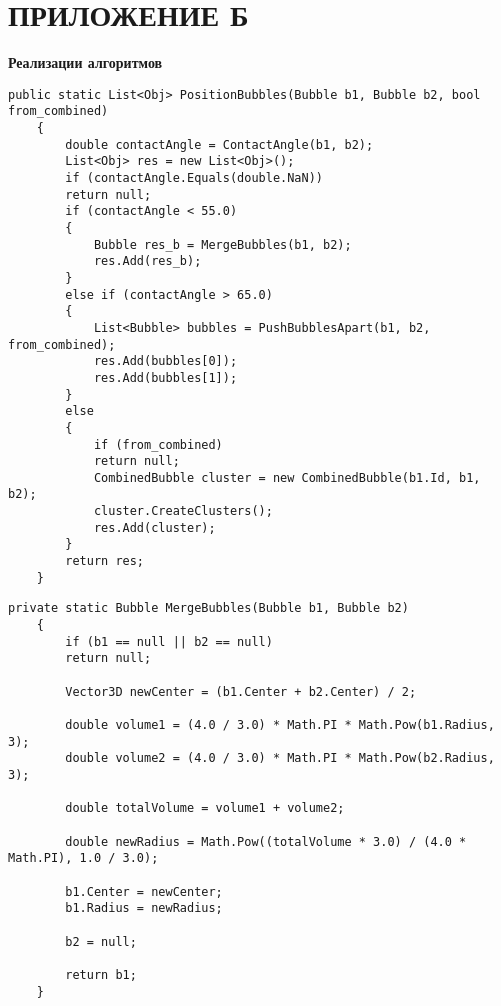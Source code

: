 \chapter*{ПРИЛОЖЕНИЕ Б}

\begin{center}
	\textbf{Реализации алгоритмов}
\end{center}

\begin{lstlisting}[label=lst:bubble_positioning, caption=Реализация алгоритма расстановки пузырьков]
	public static List<Obj> PositionBubbles(Bubble b1, Bubble b2, bool from_combined)
	{
		double contactAngle = ContactAngle(b1, b2);
		List<Obj> res = new List<Obj>();
		if (contactAngle.Equals(double.NaN))
		return null;
		if (contactAngle < 55.0)
		{
			Bubble res_b = MergeBubbles(b1, b2);
			res.Add(res_b);
		}
		else if (contactAngle > 65.0)
		{
			List<Bubble> bubbles = PushBubblesApart(b1, b2, from_combined);
			res.Add(bubbles[0]);
			res.Add(bubbles[1]);
		}
		else
		{
			if (from_combined)
			return null;
			CombinedBubble cluster = new CombinedBubble(b1.Id, b1, b2);
			cluster.CreateClusters();
			res.Add(cluster);
		}
		return res;
	}
\end{lstlisting}

\begin{lstlisting}[label=lst:merge_bubbles, caption=Реализация слияния в один большой пузырь]
	private static Bubble MergeBubbles(Bubble b1, Bubble b2)
	{
		if (b1 == null || b2 == null)
		return null;
		
		Vector3D newCenter = (b1.Center + b2.Center) / 2;
		
		double volume1 = (4.0 / 3.0) * Math.PI * Math.Pow(b1.Radius, 3);
		double volume2 = (4.0 / 3.0) * Math.PI * Math.Pow(b2.Radius, 3);
		
		double totalVolume = volume1 + volume2;
		
		double newRadius = Math.Pow((totalVolume * 3.0) / (4.0 * Math.PI), 1.0 / 3.0);
		
		b1.Center = newCenter;
		b1.Radius = newRadius;
		
		b2 = null;
		
		return b1;
	}
\end{lstlisting}

